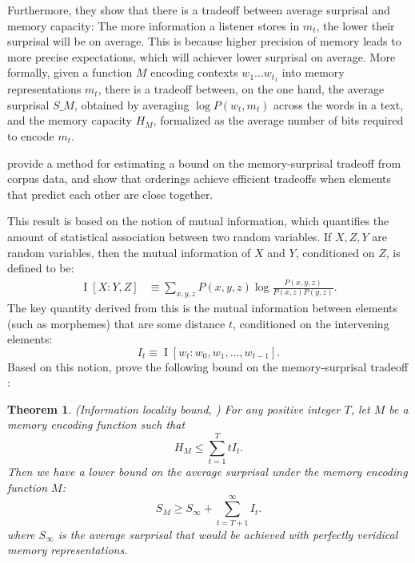 \documentclass[11pt,letterpaper]{article}
\newcounter{theorem}
\newtheorem{thm}[theorem]{Theorem}
\begin{document}
Furthermore, they show that there is a tradeoff between average surprisal and memory capacity:
The more information a listener stores in $m_t$, the lower their surprisal will be on average.
This is because higher precision of memory leads to more precise expectations, which will achiever lower surprisal on average.
More formally, given a function $M$ encoding contexts $w_1\dots w_{t_1}$ into memory representations $m_t$, there is a tradeoff between, on the one hand, the average surprisal $S\_M$, obtained by averaging $\log P(w_t , m_t)$ across the words in a text, and the memory capacity $H_M$, formalized as the average number of bits required to encode $m_t$.



\citet{Hahn2020modeling} provide a method for estimating a bound on the memory-surprisal tradeoff from corpus data, and show that orderings achieve efficient tradeoffs when elements that predict each other are close together.

This result is based on the notion of mutual information, which quantifies the amount of statistical association between two random variables.
If $X, Z, Y$ are random variables, then the mutual information of $X$ and $Y$, conditioned on $Z$, is defined to be:
\begin{align}
\label{eq:mi}
    \operatorname{I}[X:Y,Z] &\equiv \sum_{x,y,z} P(x,y,z) \log \frac{P(x,y,z)}{P(x,z)P(y,z)}. %
\end{align}
The key quantity derived from this is the mutual information between elements (such as morphemes) that are some distance $t$, conditioned on the intervening elements:
\begin{equation*}
    I_t \equiv \operatorname{I}[w_t : w_0 , w_1, \dots, w_{t-1}].
\end{equation*}
Based on this notion, \citet{Hahn2020modeling}  prove the following bound on the memory-surprisal tradeoff :
\begin{thm}\label{prop:suboptimal}(Information locality bound, \citet{Hahn2020modeling})
For any positive integer $T$, let $M$ be a memory encoding function such that
\begin{equation}
\label{eq:memory-bound}
H_M \le \sum_{t=1}^T t I_t.
\end{equation}
Then we have a lower bound on the average surprisal under the memory encoding function $M$:
\begin{equation}
\label{eq:surprisal-bound}
S_M \ge S_\infty + \sum_{t=T+1}^\infty I_t.
\end{equation}
where $S_\infty$ is the average surprisal that would be achieved with perfectly veridical memory representations.
\end{thm}
\end{document}

